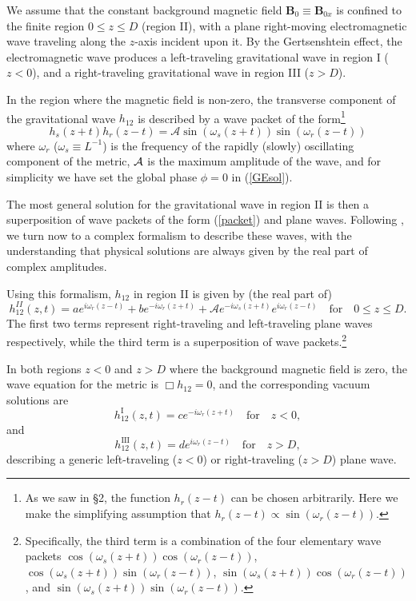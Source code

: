 \documentclass[12pt]{article}
\def\be{\begin{equation}}
\def\ee{\end{equation}}
\begin{document}
We assume that the constant background magnetic field $\textbf{B}_0 \equiv \textbf{B}_{0x}$ is confined to the finite region  $0 \le z \le D$ (region II), with a plane right-moving electromagnetic wave traveling along the $z$-axis incident upon it. By the Gertsenshtein effect, the electromagnetic wave produces a left-traveling gravitational wave in region I ($z<0$), and a right-traveling gravitational wave in region III ($z>D$).

In the region where the magnetic field is non-zero, the transverse component of the gravitational wave $h_{12}$ is described by a wave packet of the form\footnote{As we saw in \S 2, the function $h_r(z-t)$ can be chosen arbitrarily. Here we make the simplifying assumption that $h_r(z-t) \propto \sin(\omega_r(z-t))$.}
\begin{equation}\label{packet}
h_s(z+t) h_r(z-t) = \mathcal{A} \sin \left( \omega_s (z+t) \right) \sin \left(\omega_r (z-t)\right)
\end{equation}
where $\omega_r$ ($\omega_s \equiv L^{-1}$) is the frequency of the rapidly (slowly) oscillating component of the metric, $\cal A$ is the maximum amplitude of the wave, and for simplicity we have set the global phase $\phi=0$ in (\ref{GEsol}).

The most general solution for the gravitational wave in region II  is then a superposition of wave packets of the form (\ref{packet}) and plane waves. Following \cite{Bocc70}, we turn now to a complex formalism to describe these waves, with the  understanding that physical solutions are always given by the real part of complex amplitudes.

Using this formalism, $h_{12}$ in region II is given by (the real part of)
\begin{equation}\label{h12II}
    h_{12}^{II}(z,t) = a e^{i\omega_r(z-t)} + b e^{-i\omega_r(z+t)} + \mathcal{A}e^{-i\omega_s(z+t)} e^{i\omega_r(z-t)} \quad \text{for} \quad 0 \le z \le D.
\end{equation}
The first two terms represent right-traveling and left-traveling plane waves respectively, while the third term is a superposition of wave packets.\footnote{Specifically, the third term is a combination of the four elementary wave packets $\cos(\omega_s(z+t))\cos(\omega_r(z-t))$, $\cos(\omega_s(z+t))\sin(\omega_r(z-t))$, $\sin(\omega_s(z+t))\cos(\omega_r(z-t))$, and $\sin(\omega_s(z+t))\sin(\omega_r(z-t))$.}

In both regions $z<0$ and $z>D$ where the background magnetic field is zero, the wave equation for the metric is $\Box h_{1 2} = 0$, and the corresponding vacuum solutions are
\be
h_{12}^{\text{I}}(z,t) = c e^{-i\omega_r(z+t)} \quad \text{for} \quad z<0,
\ee
and
\be
h_{12}^{\text{III}}(z,t) = d e^{i\omega_r(z-t)} \quad \text{for} \quad z>D,
\ee
describing a generic left-traveling ($z<0$) or right-traveling ($z>D$) plane wave. 
\end{document}
